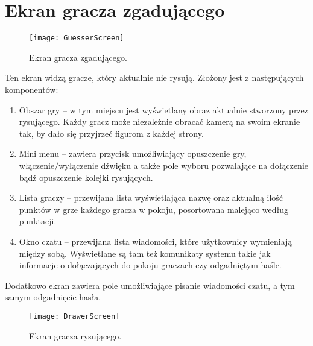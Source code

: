 \section{Ekran gracza zgadującego}
\begin{figure}[htbp]
\centering
\texttt{[image: GuesserScreen]}
\caption{Ekran gracza zgadującego.}
\label{fig:guesserscreen}
\end{figure}

Ten ekran widzą gracze, który aktualnie nie rysują. Złożony jest z następujących komponentów:
\begin{enumerate}
    \item Obszar gry – w tym miejscu jest wyświetlany obraz aktualnie stworzony przez rysującego. Każdy gracz może niezależnie obracać kamerą na swoim ekranie tak, by dało się przyjrzeć figurom z każdej strony. 
    \item Mini menu – zawiera przycisk umożliwiający opuszczenie gry, włączenie/wyłączenie dźwięku a także pole wyboru pozwalające na dołączenie bądź opuszczenie kolejki rysujących.
    \item Lista graczy – przewijana lista wyświetlająca nazwę oraz aktualną ilość punktów w grze każdego gracza w pokoju, posortowana malejąco według punktacji.
    \item Okno czatu – przewijana lista wiadomości, które użytkownicy wymieniają między sobą. Wyświetlane są tam też komunikaty systemu takie jak informacje o dołączających do pokoju graczach czy odgadniętym haśle. 
\end{enumerate}

Dodatkowo ekran zawiera pole umożliwiające pisanie wiadomości czatu, a tym samym odgadnięcie hasła.

\begin{figure}[htbp]
\centering
\texttt{[image: DrawerScreen]}
\caption{Ekran gracza rysującego.}
\label{fig:drawerscreen}
\end{figure}

